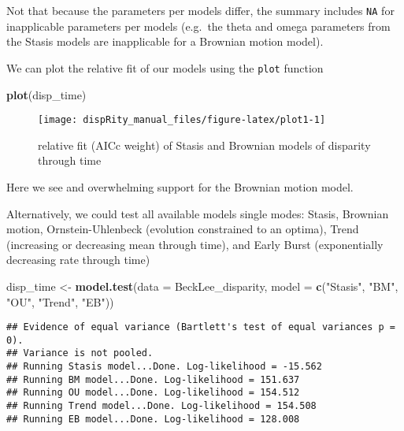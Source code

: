 \documentclass[
]{book}
\newenvironment{Shaded}{\begin{snugshade}}{\end{snugshade}}
\newcommand{\AttributeTok}[1]{\textcolor[rgb]{0.13,0.29,0.53}{#1}}
\newcommand{\FunctionTok}[1]{\textcolor[rgb]{0.13,0.29,0.53}{\textbf{#1}}}
\newcommand{\NormalTok}[1]{#1}
\newcommand{\OtherTok}[1]{\textcolor[rgb]{0.56,0.35,0.01}{#1}}
\newcommand{\StringTok}[1]{\textcolor[rgb]{0.31,0.60,0.02}{#1}}
\begin{document}
Not that because the parameters per models differ, the summary includes \texttt{NA} for inapplicable parameters per models (e.g.~the theta and omega parameters from the Stasis models are inapplicable for a Brownian motion model).

We can plot the relative fit of our models using the \texttt{plot} function

\begin{Shaded}
\begin{Highlighting}[]
\FunctionTok{plot}\NormalTok{(disp\_time)}
\end{Highlighting}
\end{Shaded}

\begin{figure}

{\centering \texttt{[image: dispRity\_manual\_files/figure-latex/plot1-1]} 

}

\caption{relative fit (AICc weight) of Stasis and Brownian models of disparity through time}\label{fig:plot1}
\end{figure}

Here we see and overwhelming support for the Brownian motion model.

Alternatively, we could test all available models single modes: Stasis, Brownian motion, Ornstein-Uhlenbeck (evolution constrained to an optima), Trend (increasing or decreasing mean through time), and Early Burst (exponentially decreasing rate through time)

\begin{Shaded}
\begin{Highlighting}[]
\NormalTok{disp\_time }\OtherTok{\textless{}{-}} \FunctionTok{model.test}\NormalTok{(}\AttributeTok{data =}\NormalTok{ BeckLee\_disparity,}
                  \AttributeTok{model =} \FunctionTok{c}\NormalTok{(}\StringTok{"Stasis"}\NormalTok{, }\StringTok{"BM"}\NormalTok{, }\StringTok{"OU"}\NormalTok{, }\StringTok{"Trend"}\NormalTok{, }\StringTok{"EB"}\NormalTok{))}
\end{Highlighting}
\end{Shaded}

\begin{verbatim}
## Evidence of equal variance (Bartlett's test of equal variances p = 0).
## Variance is not pooled.
## Running Stasis model...Done. Log-likelihood = -15.562
## Running BM model...Done. Log-likelihood = 151.637
## Running OU model...Done. Log-likelihood = 154.512
## Running Trend model...Done. Log-likelihood = 154.508
## Running EB model...Done. Log-likelihood = 128.008
\end{verbatim}
\end{document}
